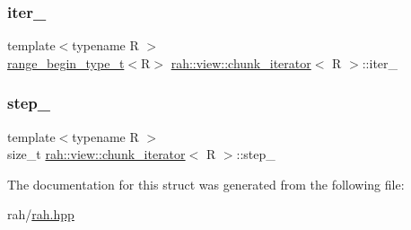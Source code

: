 \mbox{\label{structrah_1_1view_1_1chunk__iterator_aef5f9e293b2ab1757b52977197568fbf}} 
\subsubsection{\texorpdfstring{iter\_}{iter\_}}
{\footnotesize\ttfamily template$<$typename R $>$ \\
\mbox{\hyperlink{namespacerah_afa7f59d1f37c7b9d9caed37551be9eaa}{range\+\_\+begin\+\_\+type\+\_\+t}}$<$R$>$ \mbox{\hyperlink{structrah_1_1view_1_1chunk__iterator}{rah\+::view\+::chunk\+\_\+iterator}}$<$ R $>$\+::iter\+\_\+}

\mbox{\label{structrah_1_1view_1_1chunk__iterator_a71025fe393b81b113b2773063c4126be}} 
\subsubsection{\texorpdfstring{step\_}{step\_}}
{\footnotesize\ttfamily template$<$typename R $>$ \\
size\+\_\+t \mbox{\hyperlink{structrah_1_1view_1_1chunk__iterator}{rah\+::view\+::chunk\+\_\+iterator}}$<$ R $>$\+::step\+\_\+}



The documentation for this struct was generated from the following file\+:\begin{DoxyCompactItemize}
\item 
rah/\mbox{\hyperlink{rah_8hpp}{rah.\+hpp}}\end{DoxyCompactItemize}
